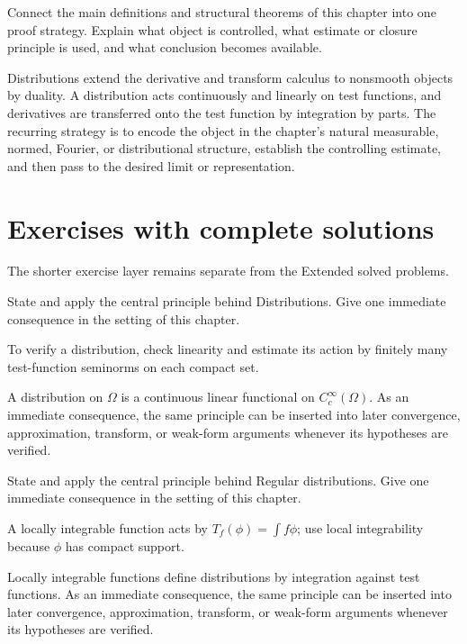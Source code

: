 \begin{problem}\label{prob:iii16-problem-12}
Connect the main definitions and structural theorems of this chapter into one proof strategy. Explain what object is controlled, what estimate or closure principle is used, and what conclusion becomes available.
\end{problem}
\begin{solution}
Distributions extend the derivative and transform calculus to nonsmooth objects by duality. A distribution acts continuously and linearly on test functions, and derivatives are transferred onto the test function by integration by parts. The recurring strategy is to encode the object in the chapter's natural measurable, normed, Fourier, or distributional structure, establish the controlling estimate, and then pass to the desired limit or representation.
\end{solution}
\section{Exercises with complete solutions}
The shorter exercise layer remains separate from the Extended solved problems.

\begin{exercise}\label{exr:iii16-01}
State and apply the central principle behind Distributions. Give one immediate consequence in the setting of this chapter.
\end{exercise}
\begin{hint}
To verify a distribution, check linearity and estimate its action by finitely many test-function seminorms on each compact set.
\end{hint}
\begin{solution}
A distribution on $\Omega$ is a continuous linear functional on $C_c^\infty(\Omega)$. As an immediate consequence, the same principle can be inserted into later convergence, approximation, transform, or weak-form arguments whenever its hypotheses are verified.
\end{solution}

\begin{exercise}\label{exr:iii16-02}
State and apply the central principle behind Regular distributions. Give one immediate consequence in the setting of this chapter.
\end{exercise}
\begin{hint}
A locally integrable function acts by \(T_f(\phi)=\int f\phi\); use local integrability because \(\phi\) has compact support.
\end{hint}
\begin{solution}
Locally integrable functions define distributions by integration against test functions. As an immediate consequence, the same principle can be inserted into later convergence, approximation, transform, or weak-form arguments whenever its hypotheses are verified.
\end{solution}

